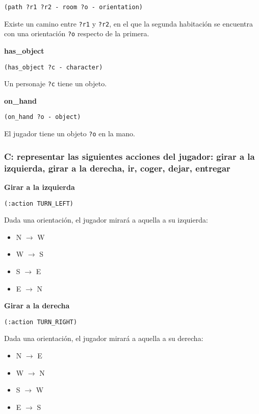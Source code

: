 \documentclass[11pt,a4paper]{article}
\begin{document}
\texttt{(path ?r1 ?r2 - room ?o - orientation)}

\smallskip

Existe un camino entre \texttt{?r1} y \texttt{?r2}, en el que la segunda habitación
se encuentra con una orientación \texttt{?o} respecto de la primera.

\medskip

\large{\textbf{has\_object}}

\texttt{(has\_object ?c - character)}

\smallskip

Un personaje \texttt{?c} tiene un objeto.

\medskip

\large{\textbf{on\_hand}}

\texttt{(on\_hand ?o - object)}

\smallskip

El jugador tiene un objeto \texttt{?o} en la mano.

\newpage

\subsubsection{C: representar las siguientes acciones del jugador: girar a la izquierda, girar a la derecha, ir, coger, dejar, entregar}

\large{\textbf{Girar a la izquierda}}

\texttt{(:action TURN\_LEFT)}

\smallskip

Dada una orientación, el jugador mirará a aquella a su izquierda:

\begin{itemize}
\item N $\rightarrow$ W
\item W $\rightarrow$ S
\item S $\rightarrow$ E
\item E $\rightarrow$ N
\end{itemize}

\medskip

\large{\textbf{Girar a la derecha}}

\texttt{(:action TURN\_RIGHT)}

\smallskip

Dada una orientación, el jugador mirará a aquella a su derecha:

\begin{itemize}
\item N $\rightarrow$ E
\item W $\rightarrow$ N
\item S $\rightarrow$ W
\item E $\rightarrow$ S
\end{itemize}
\end{document}
